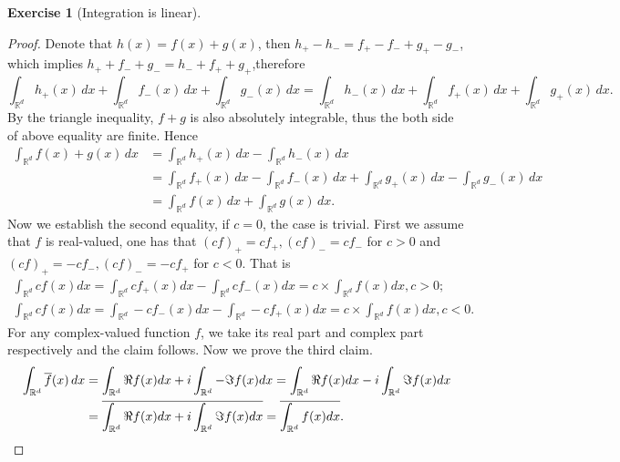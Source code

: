 \documentclass[a4paper]{article}
\newtheorem{ex}{Exercise}[subsection]
\begin{document}
\begin{ex}[Integration is linear]\end{ex}\begin{proof}
Denote that $h(x) = f(x) + g(x)$, then $h_+ - h_- = f_+ - f_- + g_+ - g_-$, which implies $h_+ + f_- + g_- = h_- 
+ f_+ + g_+$,therefore $$
\int_{\mathbb{R}^d} h_+(x)\,dx + \int_{\mathbb{R}^d} f_-(x)\,dx + \int_{\mathbb{R}^d} g_-(x)\,dx = 
\int_{\mathbb{R}^d} h_-(x)\,dx + \int_{\mathbb{R}^d} f_+(x)\,dx + \int_{\mathbb{R}^d} g_+(x)\,dx.
$$By the triangle inequality, $f + g$ is also absolutely integrable, thus the both side of above equality are finite.
Hence \begin{align*}
\int_{\mathbb{R}^d} f(x) + g(x)\,dx &= \int_{\mathbb{R}^d} h_+(x)\,dx - \int_{\mathbb{R}^d} h_-(x)\,dx \\
&= \int_{\mathbb{R}^d} f_+(x)\,dx - \int_{\mathbb{R}^d} f_-(x)\,dx + \int_{\mathbb{R}^d} g_+(x)\,dx - \int_{\mathbb{R}^d} g_-(x)\,dx\\
&= \int_{\mathbb{R}^d} f(x)\,dx + \int_{\mathbb{R}^d} g(x)\,dx.
\end{align*}
Now we establish the second equality, if $c = 0$, the case is trivial. First we assume that $f$ is real-valued,
one has that $(cf)_+ = cf_+, (cf)_- = cf_-$ for $c > 0$
and $(cf)_+ = -cf_-, (cf)_- = -cf_+$ for $c < 0$. That is \begin{gather*}
    \int_{\mathbb{R}^d} cf(x)dx = \int_{\mathbb{R}^d} cf_+(x)dx - 
    \int_{\mathbb{R}^d} cf_-(x)dx = c \times \int_{\mathbb{R}^d} f(x) dx, c > 0;\\
    \int_{\mathbb{R}^d} cf(x)dx = \int_{\mathbb{R}^d} -cf_-(x)dx - 
    \int_{\mathbb{R}^d} -cf_+(x)dx = c \times \int_{\mathbb{R}^d} f(x) dx, c < 0.
\end{gather*}
For any complex-valued function $f$, we take its real part and complex part respectively and the claim follows.
Now we prove the third claim. \begin{align*}
    \int_{\mathbb{R}^d} \overline{f}(x)\, dx &= \int_{\mathbb{R}^d} \Re  f(x) dx + i
    \int_{\mathbb{R}^d} -\Im f(x) dx = \int_{\mathbb{R}^d} \Re  f(x) dx - i
    \int_{\mathbb{R}^d} \Im f(x) dx\\
    &=\overline{\int_{\mathbb{R}^d} \Re  f(x) dx + i\int_{\mathbb{R}^d} \Im f(x) dx}
    = \overline{\int_{\mathbb{R}^d} f(x) dx}.\qedhere
\end{align*}
\end{proof}
\end{document}
